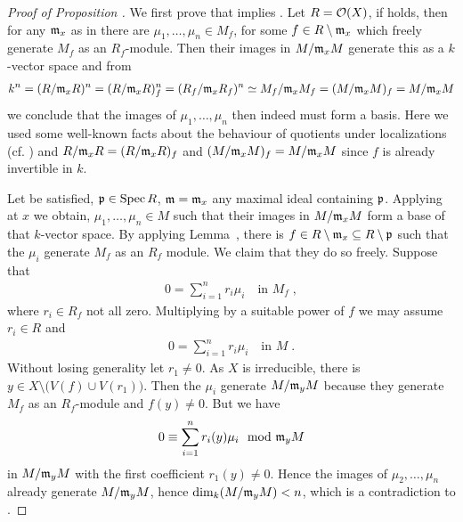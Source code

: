 \documentclass[a4paper,parskip=half,numbers=enddot, DIV=12]{scrreprt}
\begin{document}
\begin{proof}[Proof of Proposition ]
    We first prove that  implies . Let $R=\mathcal{O}(X)$, if  holds, then for any $\mathfrak{m}_x$ as in  there are $\mu_1,\ldots,\mu_n\in M_f$, for some $f\in R\setminus \mathfrak{m}_x$ which freely generate $M_f$ as an $R_f$-module. Then their images in $M/\mathfrak{m}_x M$ generate this as a $k$-vector space and from 
    \begin{align*}
    	k^n=(R/\mathfrak{m}_xR)^n=(R/\mathfrak{m}_xR)_f^n=(R_f/\mathfrak{m}_xR_f)^n\simeq M_f/\mathfrak{m}_xM_f=(M/\mathfrak{m}_xM)_f=M/\mathfrak{m}_xM
    \end{align*}
    we conclude that the images of $\mu_1,\ldots,\mu_n$ then indeed must form a basis. Here we used some well-known facts about the behaviour of quotients under localizations (cf. \cite[Proposition~2.3.2]{alg1}) and $R/\mathfrak{m}_xR=(R/\mathfrak{m}_xR)_f$ and $(M/\mathfrak{m}_xM)_f=M/\mathfrak{m}_xM$ since $f$ is already invertible in $k$.
    
    Let  be satisfied, $\mathfrak{p}\in \operatorname{Spec} R$, $\mathfrak{m} = \mathfrak{m}_x$ any maximal ideal containing $\mathfrak{p}$. Applying  at $x$ we obtain, $\mu_1,\ldots,\mu_n\in M$ such that their images in $M/\mathfrak{m}_x M$ form a base of that $k$-vector space. By applying Lemma~, there is $f\in R\setminus\mathfrak{m}_x\subseteq R\setminus \mathfrak{p}$ such that the $\mu_i$ generate $M_f$ as an $R_f$ module. We claim that they do so freely. Suppose that 
    \begin{align*}
    	0 = \sum_{i=1}^nr_i \mu_i\quad\text{in }M_f\;,
    \end{align*}
    where $r_i\in R_f$ not all zero. Multiplying by a suitable power of $f$ we may assume $r_i\in R$ and 
    \begin{align*}
    	 0=\sum_{i=1}^n r_i \mu_i \quad\text{in }M\;.
    \end{align*}
   Without losing generality let $r_1 \neq 0$. As $X$ is irreducible, there is $y\in X\setminus\big(V(f)\cup V(r_1)\big)$. Then the $\mu_i$ generate $M/\mathfrak{m}_y M$ because they generate $M_f$ as an $R_f$-module and $f(y)\neq 0$. But we have
    \begin{align*}
        0 \equiv\sum_{i=1}^n r_i(y) \mu_i \mod {\mathfrak{m}}_y M
    \end{align*}
    in $M/\mathfrak{m}_y M$ with the first coefficient $r_1(y) \neq 0$. Hence the images of $\mu_2,\ldots,\mu_n$ already generate $M/\mathfrak{m}_y M$, hence $\dim_k(M/\mathfrak{m}_y M) <n$, which is a contradiction to .
\end{proof}
\end{document}
